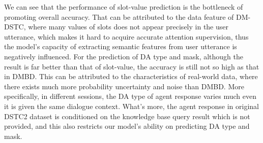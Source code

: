 We can see that the performance of slot-value prediction is the bottleneck of promoting overall accuracy. That can be attributed to the data feature of DM-DSTC, where many values of slots does not appear precisely in the user utterance, which makes it hard to acquire accurate attention supervision, thus the model's capacity of extracting semantic features from user utterance is negatively influenced. For the prediction of DA type and mask, although the result is far better than that of slot-value, the accuracy is still not so high as that in DMBD. This can be attributed to the characteristics of real-world data, where there exists much more probability uncertainty and noise than DMBD. More specifically, in different sessions, the DA type of agent response varies much even it is given the same dialogue context. What's more, the agent response in original DSTC2 dataset is conditioned on the knowledge base query result which is not provided, and this also restricts our model's ability on predicting DA type and mask.






